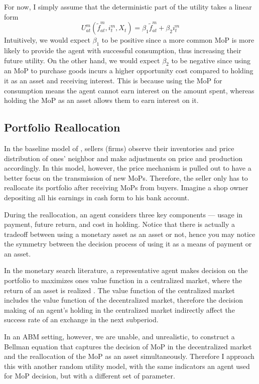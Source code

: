 For now, I simply assume that the deterministic part of the utility takes a
linear form
\begin{equation}
   U^m_{at}(\tilde{f}^m_{at}, i^m_t, X_t) = \beta_1 \tilde{f}^m_{at} + \beta_2 i^m_t
\end{equation}
Intuitively, we would expect $\beta_1$ to be positive since a more common MoP is
more likely to provide the agent with successful consumption, thus increasing
their future utility. On the other hand, we would expect $\beta_2$ to be
negative since using an MoP to purchase goods incurs a higher opportunity cost
compared to holding it as an asset and receiving interest. This is because using
the MoP for consumption means the agent cannot earn interest on the amount
spent, whereas holding the MoP as an asset allows them to earn interest on it.

\subsection{Portfolio Reallocation}

In the baseline model of \citet*{HandbookABM}, sellers (firms) observe their
inventories and price distribution of ones' neighbor and make adjustments on
price and production accordingly. In this model, however, the price mechanism is
pulled out to have a better focus on the transmission of new MoPs. Therefore,
the seller only has to reallocate its portfolio after receiving MoPs from
buyers. Imagine a shop owner depositing all his earnings in cash form to his
bank account.

During the reallocation, an agent considers three key components --- usage in
payment, future return, and cost in holding. Notice that there is actually a
tradeoff between using a monetary asset as an asset or not, hence you may notice
the symmetry between the decision process of using it as a means of payment or
an asset.

In the monetary search literature, a representative agent makes decision on the
portfolio to maximizes ones value function in a centralized market, where the
return of an asset is realized \citep*{LW05,LiLi19}. The value function of the
centralized market includes the value function of the decentralized market,
therefore the decision making of an agent's holding in the centralized market
indirectly affect the success rate of an exchange in the next subperiod.

In an ABM setting, however, we are unable, and unrealistic, to construct a
Bellman equation that captures the decision of MoP in the decentralized market
and the reallocation of the MoP as an asset simultaneously. Therefore I approach
this with another random utility model, with the same indicators an agent used
for MoP decision, but with a different set of parameter.

